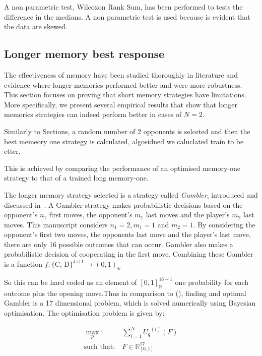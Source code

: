 \documentclass[10pt]{article}
\newcommand{\R}{\mathbb{R}}
\begin{document}
\begin{table}
    \centering
    \resizebox{.5\columnwidth}{!}{%
    }
    \caption{A non parametric test, Wilcoxon Rank Sum, has been performed to
    tests the difference in the medians. A non parametric test is used because
    is evident that the data are skewed.}\label{table:wilcoxon_tests}
\end{table}

\subsection{Longer memory best response}\label{subsection:longer_memory_best_response}

The effectiveness of memory have been studied thoroughly in literature and
evidence where longer memories performed better and were more robustness. This
section focuses on proving that short memory strategies have limitations. More
specifically, we present several empirical results that show that longer
memories strategies can indeed perform better in cases of \(N=2\).

Similarly to Sections, a random number of 2 opponents is selceted and then the
best memeory one strategy is calculated, algosidned we caluclated train
to be etter.

This is achieved by comparing the performance of an optimised
memory-one strategy to that of a trained long memory-one.

The longer memory strategy selected is a strategy called \textit{Gambler},
introduced and discussed in~\cite{Harper2017}. A Gambler strategy makes
probabilistic decisions based on the opponent's \(n_1\) first moves, the
opponent's \(m_1\) last moves and the player's \(m_2\) last moves. This
manuscript considers $n_1 = 2, m_1 = 1$ and $m_2 = 1$. By considering the
opponent's first two moves, the opponents last move and the player's last move,
there are only 16 possible outcomes that can occur. Gambler also makes a
probabilistic decision of cooperating in the first move. Combining these Gambler
is a function \(f: \{\text{C, D}\}^{4 \cup 1} \rightarrow (0, 1)_{\R}\)

So this can be hard coded as an element of \([0, 1]_{\R} ^ {16 + 1}\) one
probability for each outcome plus the opening move.Thus in comparison to (),
finding and optimal Gambler is a 17 dimensional problem, which is solved
numerically using Bayesian optimisation. The optimisation problem is given by:

\begin{equation}\label{eq:gambler_optimisation}
    \begin{aligned}
    \max_p: & \ \sum_{i=1} ^ {N} {U_q}^{(i)} (F)
    \\
    \text{such that}: & \ F \in \R_{[0, 1]}^{17}
    \end{aligned}
\end{equation}
\end{document}
